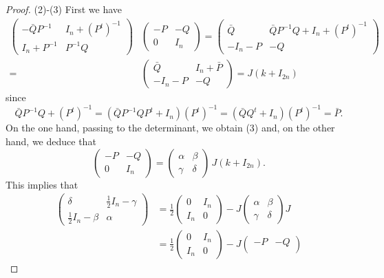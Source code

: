 \documentclass[12pt]{amsart}
\numberwithin{equation}{section}
\begin{document}
\begin{proof}
(2)-(3) First we have
\begin{align*}
\begin{pmatrix}-{\bar Q}P^{-1} &I_n+(P^t)^{-1}\\
I_n+P^{-1}&P^{-1}Q \end{pmatrix}&\begin{pmatrix} -P&-Q\\
0&I_n \end{pmatrix}=\begin{pmatrix} {\bar Q}&{\bar Q}P^{-1}Q +I_n+(P^t)^{-1}\\
-I_n-P&-Q \end{pmatrix}\\=&\begin{pmatrix} {\bar Q}&I_n+{\bar P}\\
-I_n-P&-Q \end{pmatrix}=J(k+I_{2n})\end{align*}
since \begin{equation*}{\bar Q}P^{-1}Q +(P^t)^{-1}=({\bar Q}P^{-1}QP^t+I_n)(P^t)^{-1}=({\bar Q}Q^t+I_n)(P^t)^{-1}={\bar P}.\end{equation*}
On the one hand, passing to the determinant, we obtain (3) and, on the other hand, we 
deduce that
\begin{equation*}\begin{pmatrix} -P&-Q\\
0&I_n \end{pmatrix}=\begin{pmatrix} \alpha &\beta \\
\gamma & \delta  \end{pmatrix}\,J(k+I_{2n}).\end{equation*}
This implies that
\begin{align*}\begin{pmatrix}\delta &\tfrac{1}{2}I_n-\gamma\\
\tfrac{1}{2}I_n-\beta&\alpha \end{pmatrix}&=\frac{1}{2}\begin{pmatrix} 0&I_n\\
I_n&0 \end{pmatrix}-J\begin{pmatrix} \alpha &\beta \\
\gamma & \delta  \end{pmatrix}J\\
&=\frac{1}{2}\begin{pmatrix} 0&I_n\\
I_n&0 \end{pmatrix}-J\begin{pmatrix} -P&-Q\\

\end{pmatrix}
\end{align*}
\end{proof}
\end{document}
